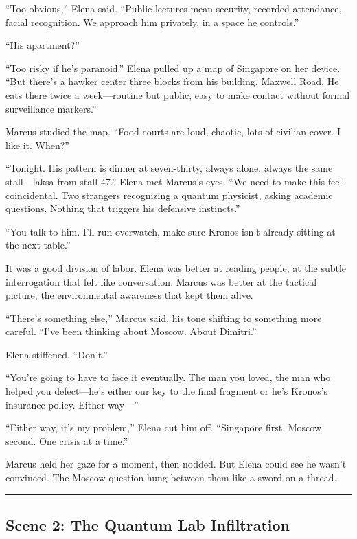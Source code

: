 \documentclass[12pt,letterpaper]{book}
\begin{document}
``Too obvious,'' Elena said. ``Public lectures mean security, recorded attendance, facial recognition. We approach him privately, in a space he controls.''

``His apartment?''

``Too risky if he's paranoid.'' Elena pulled up a map of Singapore on her device. ``But there's a hawker center three blocks from his building. Maxwell Road. He eats there twice a week---routine but public, easy to make contact without formal surveillance markers.''

Marcus studied the map. ``Food courts are loud, chaotic, lots of civilian cover. I like it. When?''

``Tonight. His pattern is dinner at seven-thirty, always alone, always the same stall---laksa from stall 47.'' Elena met Marcus's eyes. ``We need to make this feel coincidental. Two strangers recognizing a quantum physicist, asking academic questions. Nothing that triggers his defensive instincts.''

``You talk to him. I'll run overwatch, make sure Kronos isn't already sitting at the next table.''

It was a good division of labor. Elena was better at reading people, at the subtle interrogation that felt like conversation. Marcus was better at the tactical picture, the environmental awareness that kept them alive.

``There's something else,'' Marcus said, his tone shifting to something more careful. ``I've been thinking about Moscow. About Dimitri.''

Elena stiffened. ``Don't.''

``You're going to have to face it eventually. The man you loved, the man who helped you defect---he's either our key to the final fragment or he's Kronos's insurance policy. Either way---''

``Either way, it's my problem,'' Elena cut him off. ``Singapore first. Moscow second. One crisis at a time.''

Marcus held her gaze for a moment, then nodded. But Elena could see he wasn't convinced. The Moscow question hung between them like a sword on a thread.

\begin{center}\rule{0.5\linewidth}{0.5pt}\end{center}

\hypertarget{scene-2-the-quantum-lab-infiltration}{%
\subsection{Scene 2: The Quantum Lab Infiltration}\label{scene-2-the-quantum-lab-infiltration}}
\end{document}
